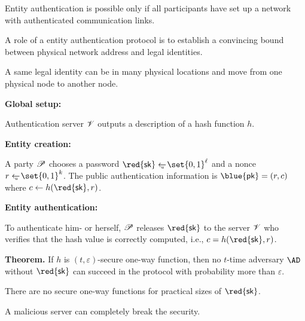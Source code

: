 \documentclass[landscape,footrule]{foils}
\newcommand{\spreadappart}{\vspace*{\fill}}
\renewcommand{\SK}{{\red{\mathsf{sk}}}}
\renewcommand{\PK}{{\blue{\mathsf{pk}}}}
\begin{document}
\bigskip
\spreadappart

\begin{triangles}
\item Entity authentication is possible only if all participants have
  set up a network with authenticated communication links.
\item A role of a entity authentication protocol is to establish a
  convincing bound between physical network address and legal
  identities.
\item A same legal identity can be in many physical locations and move
  from one physical node to another node.
\end{triangles}




\textbf{Global setup:}  \\
\hspace*{0.03\linewidth}
\begin{minipage}[t]{0.97\linewidth}
  Authentication server $\mathscr{V}$ outputs a description of a hash function $h$.
\end{minipage}

\textbf{Entity creation:}  \\
\hspace*{0.03\linewidth}
\begin{minipage}[t]{0.97\linewidth}
  A party $\mathscr{P}$ chooses a password $\SK\getsu\set{0,1}^\ell$ and
  a nonce $r\getsu\set{0,1}^k$. The public authentication information
  is $\PK=(r,c)$ where $c\gets h(\SK,r)$.
\end{minipage}

\textbf{Entity authentication:}  \\
\hspace*{0.03\linewidth}
\begin{minipage}[t]{0.97\linewidth}
  To authenticate him- or herself, $\mathscr{P}$ releases $\SK$ to the
  server $\mathscr{V}$ who verifies that the hash value is correctly
  computed, i.e., $c= h(\SK,r)$.
\end{minipage}\vspace*{2ex}

\textbf{Theorem.}  If $h$ is $(t,\varepsilon)$-secure one-way
function, then no $t$-time adversary $\AD$ without $\SK$ can succeed in the protocol
with probability more than $\varepsilon$.
\begin{triangles}
\item There are no secure one-way functions for practical sizes of
  $\SK$.
\item A malicious server can completely break the security. 
\end{triangles}
\end{document}
